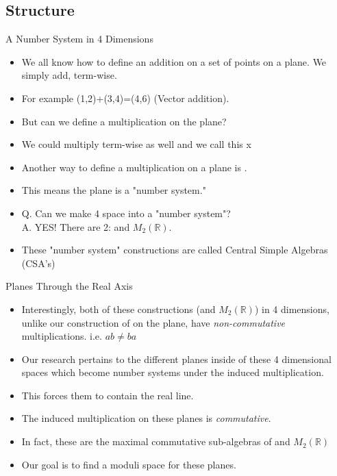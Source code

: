 \documentclass[t,slidestop,compress,mathserif,color=option,hyperref={pdfstartview={Fit},pdfpagelayout={SinglePage},pdfpagemode={UseOutlines}}]{beamer}
\begin{document}
\subsection{Structure}

\begin{frame}{A Number System in 4 Dimensions}
  \begin{itemize}
      \item We all know how to define an addition on a set of points on a plane. We simply add, term-wise.
      \item For example (1,2)+(3,4)=(4,6) (Vector addition).
      \item But can we define a multiplication on the plane?
      \item We could multiply term-wise as well and we call this \bR x \bR
      \item Another way to define a multiplication on a plane is \bC.
      \item This means the plane is a "number system."
      \item Q. Can we make 4 space into a "number system"? \\
            A. YES! There are 2: \bH and $M_2(\mathbb{R})$.
      \item These "number system" constructions are called Central Simple Algebras (CSA's)
  \end{itemize}
 \end{frame}
 
 \begin{frame}{Planes Through the Real Axis}
  \begin{itemize}
      \item Interestingly, both of these constructions (\bH and $M_2(\mathbb{R})$) in 4 dimensions, unlike our construction of \bC on the plane, have \textit{non-commutative} multiplications. i.e. $ab\ne ba$
      \item Our research pertains to the different planes inside of these 4 dimensional spaces which become number systems under the induced multiplication. 
      \item This forces them to contain the real line. 
      \item The induced multiplication on these planes is \textit{commutative}.
      \item In fact, these are the maximal commutative sub-algebras of \bH and $M_2(\mathbb{R})$
      \item Our goal is to find a moduli space for these planes.
  \end{itemize}
\end{frame}
\end{document}

